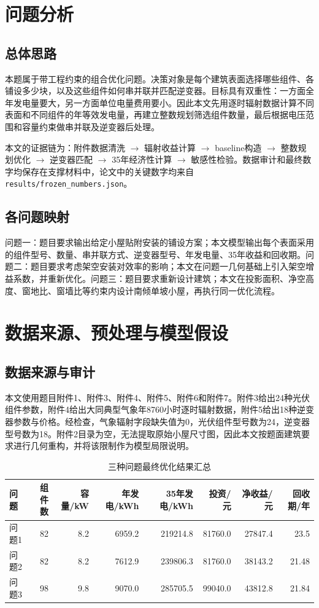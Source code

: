\documentclass[UTF8,a4paper,12pt]{ctexart}
\begin{document}
\section{问题分析}
\subsection{总体思路}
本题属于带工程约束的组合优化问题。决策对象是每个建筑表面选择哪些组件、各铺设多少块，以及这些组件如何串并联并匹配逆变器。目标具有双重性：一方面全年发电量要大，另一方面单位电量费用要小。因此本文先用逐时辐射数据计算不同表面和不同组件的年等效发电量，再建立整数规划筛选组件数量，最后根据电压范围和容量约束做串并联及逆变器后处理。

本文的证据链为：附件数据清洗 $\rightarrow$ 辐射收益计算 $\rightarrow$ baseline构造 $\rightarrow$ 整数规划优化 $\rightarrow$ 逆变器匹配 $\rightarrow$ 35年经济性计算 $\rightarrow$ 敏感性检验。数据审计和最终数字均保存在支撑材料中，论文中的关键数字均来自\verb|results/frozen_numbers.json|。

\subsection{各问题映射}
问题一：题目要求输出给定小屋贴附安装的铺设方案；本文模型输出每个表面采用的组件型号、数量、串并联方式、逆变器型号、年发电量、35年收益和回收期。问题二：题目要求考虑架空安装对效率的影响；本文在问题一几何基础上引入架空增益系数，并重新优化。问题三：题目要求重新设计建筑；本文在投影面积、净空高度、窗地比、窗墙比等约束内设计南倾单坡小屋，再执行同一优化流程。

\section{数据来源、预处理与模型假设}
\subsection{数据来源与审计}
本文使用题目附件1、附件3、附件4、附件5、附件6和附件7。附件3给出24种光伏组件参数，附件4给出大同典型气象年8760小时逐时辐射数据，附件5给出18种逆变器参数与价格。经检查，气象辐射字段缺失值为0，光伏组件型号数为24，逆变器型号数为18。附件2目录为空，无法提取原始小屋尺寸图，因此本文按题面建筑要求进行几何重构，并将该限制作为模型局限说明。

\begin{table}[H]\centering\caption{三种问题最终优化结果汇总}
\begin{tabular}{lrrrrrrr}\toprule
问题 & 组件数 & 容量/kW & 年发电/kWh & 35年发电/kWh & 投资/元 & 净收益/元 & 回收期/年\\\midrule
问题1 & 82 & 8.2 & 6959.2 & 219214.8 & 81760.0 & 27847.4 & 23.5\\
问题2 & 82 & 8.2 & 7612.9 & 239806.3 & 81760.0 & 38143.2 & 21.48\\
问题3 & 98 & 9.8 & 9070.0 & 285705.5 & 99040.0 & 43812.8 & 21.84\\
\bottomrule\end{tabular}\end{table}
\end{document}
